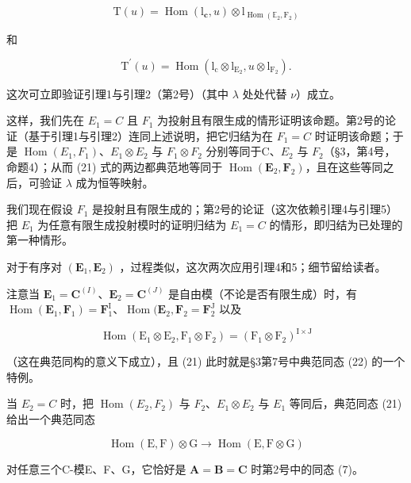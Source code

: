 \[
\mathrm{T} (u) = \operatorname{Hom} (\mathrm{l} _ {\mathbf {c}}, u) \otimes \mathrm{l} _ {\operatorname{Hom} (\mathbb {E} _ {2}, \mathrm{F} _ {2})}
\]

和

\[
\mathrm{T} ^ {\prime} (u) = \operatorname{Hom} (\mathrm{l} _ {\mathrm{c}} \otimes \mathrm{l} _ {\mathrm{E} _ {2}}, u \otimes \mathrm{l} _ {\mathrm{F} _ {2}}).
\]

这次可立即验证引理1与引理2（第2号）（其中 \(\lambda\) 处处代替 \(\nu\)）成立。

这样，我们先在 \(E_{1} = C\) 且 \(F_{1}\) 为投射且有限生成的情形证明该命题。第2号的论证（基于引理1与引理2）连同上述说明，把它归结为在 \(F_{1} = C\) 时证明该命题；于是 \(\operatorname{Hom}(E_{1}, F_{1})\)、\(E_{1} \otimes E_{2}\) 与 \(F_{1} \otimes F_{2}\) 分别等同于C、\(E_{2}\) 与 \(F_{2}\)（§3，第4号，命题4）；从而 (21) 式的两边都典范地等同于 \(\operatorname{Hom}(\mathbf{E}_{2},\mathbf{F}_{2})\)，且在这些等同之后，可验证 \(\lambda\) 成为恒等映射。

我们现在假设 \(F_{1}\) 是投射且有限生成的；第2号的论证（这次依赖引理4与引理5）把 \(E_{1}\) 为任意有限生成投射模时的证明归结为 \(E_{1} = C\) 的情形，即归结为已处理的第一种情形。

对于有序对 \((\mathbf{E}_{1}, \mathbf{E}_{2})\) ，过程类似，这次两次应用引理4和5；细节留给读者。

注意当 \(\mathbf{E}_1 = \mathbf{C}^{(I)}\)、\(\mathbf{E}_2 = \mathbf{C}^{(J)}\) 是自由模（不论是否有限生成）时，有 \(\operatorname{Hom}(\mathbf{E}_1, \mathbf{F}_1) = \mathbf{F}_1^{\mathrm{I}}\)、\(\operatorname{Hom}(\mathbf{E}_2, \mathbf{F}_2 = \mathbf{F}_2^{\mathrm{J}}\) 以及

\[
\operatorname{Hom} \left(\mathrm{E} _ {1} \otimes \mathrm{E} _ {2}, \mathrm{F} _ {1} \otimes \mathrm{F} _ {2}\right) = \left(\mathrm{F} _ {1} \otimes \mathrm{F} _ {2}\right) ^ {\mathrm{I} \times \mathrm{J}}
\]

（这在典范同构的意义下成立），且 (21) 此时就是§3第7号中典范同态 (22) 的一个特例。

当 \(E_{2} = C\) 时，把 \(\operatorname{Hom}(E_{2}, F_{2})\) 与 \(F_{2}\)、\(E_{1} \otimes E_{2}\) 与 \(E_{1}\) 等同后，典范同态 (21) 给出一个典范同态

\[
\operatorname{Hom} (\mathrm{E}, \mathrm{F}) \otimes \mathrm{G} \rightarrow \operatorname{Hom} (\mathrm{E}, \mathrm{F} \otimes \mathrm{G})\tag{22}
\]

对任意三个C-模E、F、G，它恰好是 \(\mathbf{A} = \mathbf{B} = \mathbf{C}\) 时第2号中的同态 (7)。

